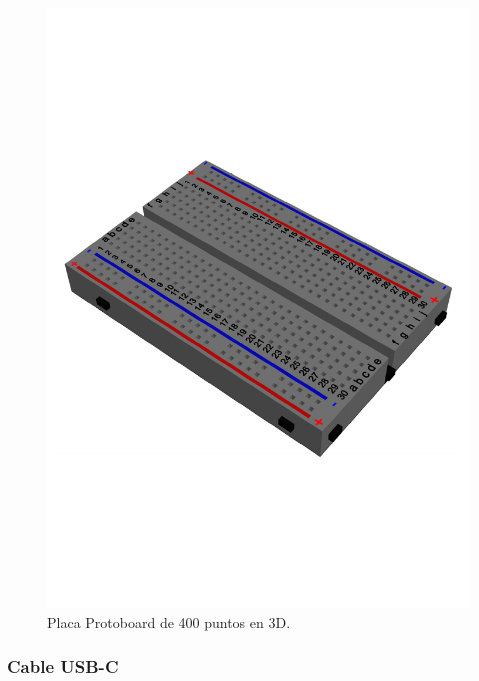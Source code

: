     \begin{figure}[H]
        \centering
        \includegraphics[scale=0.4]{15/img/placaProtoboardModelo.pdf}
        \caption{Placa Protoboard de 400 puntos en 3D.}
        \label{fig:placaProtoboardModelo}
    \end{figure}
    
    \subsubsection{Cable USB-C}
    
    
    
    

